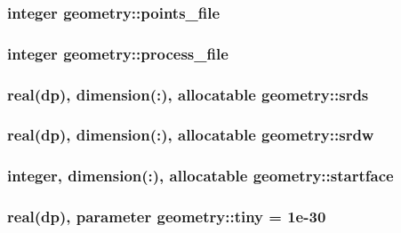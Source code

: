 \hypertarget{classgeometry_a4f9606dd6dec8a18282daf3096cd7074}{
\subsubsection[{points\-\_\-file}]{\setlength{\rightskip}{0pt plus 5cm}integer geometry\-::points\-\_\-file}}\label{classgeometry_a4f9606dd6dec8a18282daf3096cd7074}
\hypertarget{classgeometry_a6d6c8b4ed2fdb31e8b906eccb7fe8bd2}{
\subsubsection[{process\-\_\-file}]{\setlength{\rightskip}{0pt plus 5cm}integer geometry\-::process\-\_\-file}}\label{classgeometry_a6d6c8b4ed2fdb31e8b906eccb7fe8bd2}
\hypertarget{classgeometry_ad2388cd69f1b9efc5b4dafab1540e6fd}{
\subsubsection[{srds}]{\setlength{\rightskip}{0pt plus 5cm}real(dp), dimension(\-:), allocatable geometry\-::srds}}\label{classgeometry_ad2388cd69f1b9efc5b4dafab1540e6fd}
\hypertarget{classgeometry_ad4f99f0dbd2866ccd6bb897c324fbbb9}{
\subsubsection[{srdw}]{\setlength{\rightskip}{0pt plus 5cm}real(dp), dimension(\-:), allocatable geometry\-::srdw}}\label{classgeometry_ad4f99f0dbd2866ccd6bb897c324fbbb9}
\hypertarget{classgeometry_a18f4eb284c2fb036786e7cb078b1261b}{
\subsubsection[{startface}]{\setlength{\rightskip}{0pt plus 5cm}integer, dimension(\-:), allocatable geometry\-::startface}}\label{classgeometry_a18f4eb284c2fb036786e7cb078b1261b}
\hypertarget{classgeometry_a8f9a710dae624d649ba6196d6a3ad819}{
\subsubsection[{tiny}]{\setlength{\rightskip}{0pt plus 5cm}real(dp), parameter geometry\-::tiny = 1e-\/30}}\label{classgeometry_a8f9a710dae624d649ba6196d6a3ad819}
